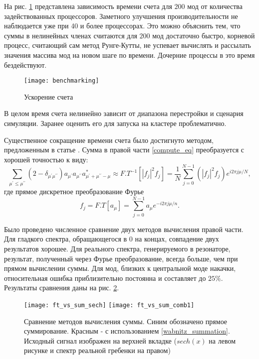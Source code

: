 На рис. \ref{bechmarking} представлена зависимость времени счета для $200$ мод от количества задействованных процессоров. Заметного улучшения производительности не наблюдается уже при 40 и более процессорах. Это можно объяснить тем, что суммы в нелинейных членах считаются для $200$ мод достаточно быстро, корневой процесс, считающий сам метод Рунге-Кутты, не успевает вычислять и рассылать значения массива мод на новом шаге по времени. Дочерние процессы в это время бездействуют.

\begin{figure}
 \centering
 \texttt{[image: benchmarking]}
 \caption{Ускорение счета} \label{bechmarking}
\end{figure}

В целом время счета нелинейно зависит от диапазона перестройки и сценария симуляции. Заранее оценить его для запуска на кластере проблематично.

Существенное сокращение времени счета было достигнуто методом, предложенным в статье \cite{wabnitz}. Сумма в правой части \eqref{compute_eq} преобразуется с хорошей точностью к виду:
\begin{equation}\label{wabnitz_summation}
\sum_{\mu^\prime\le\mu^{\prime\prime}} (2-\delta_{\mu^\prime\mu^{\prime\prime}})a_{\mu^\prime}a_{\mu^{\prime\prime}}a_{\mu^\prime+\mu^{\prime\prime}-\mu}^*\approx F.T^{-1}[|f_j|^2f_j]
=\frac{1}{N}\sum_{j=0}^{N-1}(|f_j|^2f_j)e^{i2\pi j\mu /N},
\end{equation}
где прямое дискретное преобразование Фурье
\begin{equation}
f_j=F.T[a_\mu]=\sum_{j=0}^{N-1}a_\mu e^{-i2\pi j\mu/n}.
\end{equation}

Было проведено численное сравнение двух методов вычисления правой части. Для гладкого спектра, обращающегося в $0$ на концах, совпадение двух результатов хорошее. Для реального спектра, генерируемого в резонаторе, результат, полученный через Фурье преобразование, всегда больше, чем при прямом вычислении суммы. Для мод, близких к центральной моде накачки, относительная ошибка приблизительно постоянна и составляет до $25\%$. Результаты сравнения даны на рис. \ref{ft_vs_sum}.

\begin{figure}
 \texttt{[image: ft\_vs\_sum\_sech]}
 \texttt{[image: ft\_vs\_sum\_comb1]}
 \caption{Сравнение методов вычисления суммы. Синим обозначено прямое суммирование. Красным - с использованием \eqref{wabnitz_summation}. Исходный сигнал изображен на верхней вкладке ($sech(x)$ на левом рисунке и спектр реальной гребенки на правом)} \label{ft_vs_sum}
\end{figure}

